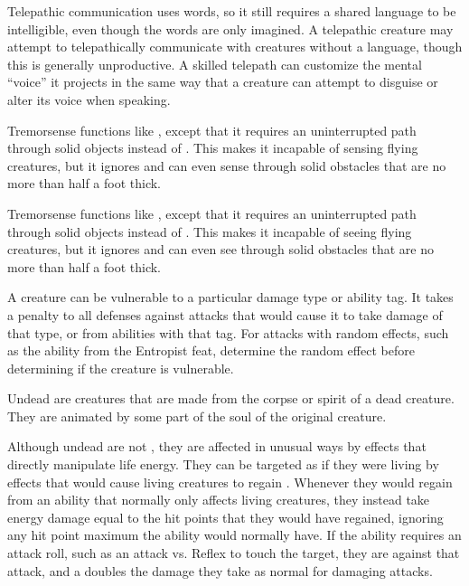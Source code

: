   Telepathic communication uses words, so it still requires a shared language to be intelligible, even though the words are only imagined.
  A telepathic creature may attempt to telepathically communicate with creatures without a language, though this is generally unproductive.
  A skilled telepath can customize the mental ``voice'' it projects in the same way that a creature can attempt to disguise or alter its voice when speaking.

  Tremorsense functions like , except that it requires an uninterrupted path through solid objects instead of .
  This makes it incapable of sensing flying creatures, but it ignores  and can even sense through solid obstacles that are no more than half a foot thick.

  Tremorsense functions like , except that it requires an uninterrupted path through solid objects instead of .
  This makes it incapable of seeing flying creatures, but it ignores  and can even see through solid obstacles that are no more than half a foot thick.

  A creature can be vulnerable to a particular damage type or ability tag.
  It takes a  penalty to all defenses against attacks that would cause it to take damage of that type, or from abilities with that tag.
  For attacks with random effects, such as the  ability from the Entropist feat, determine the random effect before determining if the creature is vulnerable.

  Undead are creatures that are made from the corpse or spirit of a dead creature.
  They are animated by some part of the soul of the original creature.

  Although undead are not , they are affected in unusual ways by effects that directly manipulate life energy.
  They can be targeted as if they were living  by \magical effects that would cause living creatures to regain .
  Whenever they would regain  from an ability that normally only affects living creatures, they instead take energy damage equal to the hit points that they would have regained, ignoring any hit point maximum the ability would normally have.
  If the ability requires an attack roll, such as an attack vs. Reflex to touch the target, they are \vulnerable against that attack, and a  doubles the damage they take as normal for damaging attacks.

